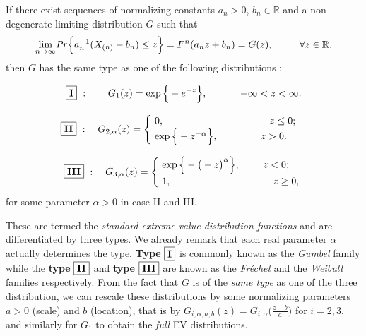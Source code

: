 \begin{theorem} \label{extthm}
 If there exist sequences of normalizing constants $a_n>0$, $b_n\in\mathbb{R}$ and a non-degenerate limiting distribution $G$ such that 
	\begin{equation} \label{exttheom}
	\displaystyle{\lim_{n \to \infty}}\text{\emph{Pr}}\Big\{ a_n^{-1}(X_{(n)}-b_n)\leq z\Big\}=F^n(a_nz+b_n)
	= G(z), \ \ \ \ \ \ \ \ \forall z\in\mathbb{R},
	\end{equation}
then $G$ has the same type as one of the following distributions : 

\begin{equation}\label{gumb}
\boxed{\textbf{\text{I}}}\ : \qquad G_{1}(z)= 
\exp\Big\{-e^{-z}\Big\}, \ \ \quad \quad \ \ -\infty<z<\infty.    
\end{equation}


\begin{equation} \label{frech}
\boxed{\textbf{\text{II}}} \  :  \quad G_{2,\alpha}(z)=
\begin{cases}
\ 0, \ \ \ \ \ \ \ \ \ \ \ \qquad \quad \ \ \ \ \ \ \ \quad \ \ z\leq 0; \\
\ \exp\Big\{-z^{-\alpha}\Big\}, \ \ \ \quad \ \quad \ \ \ z>0.    
\end{cases}
\end{equation}

\begin{equation} \label{weib}
\ \ \boxed{\textbf{\text{III}}} \ :  \quad G_{3,\alpha}(z)=\begin{cases}
\ \exp\Big\{-\big(-z\big)^{\alpha}\Big\}, \quad \quad \   z<0;     \\
\  1, \ \ \ \ \ \ \qquad \quad \quad \ \ \ \ \ \ \ \ \  \   \quad z\geq 0,
\end{cases}
\end{equation}
for some parameter $\alpha>0$ in case II and III.
\end{theorem}

These are termed the \emph{standard extreme value distribution functions} and are differentiated by three types. We already remark that each real parameter $\alpha$ actually determines the type. \textbf{Type} $\boxed{\textbf{\text{I}}}$ is commonly known as the \emph{Gumbel} family while the \textbf{type} $\boxed{\textbf{\text{II}}}$  and \textbf{type} $\boxed{\textbf{\text{III}}}$ are known as the \emph{Fréchet} and the \emph{Weibull} families respectively. From the fact that $G$ is of the \emph{same type} as one of the three distribution, we can rescale these distributions by some normalizing parameters $a>0$ (scale) and $b$ (location), that is by $G_{i,\alpha, a,b}(z)=G_{i,\alpha}\Big(\frac{z-b}{a}\Big)$ for $i=2,3$, and similarly for $G_1$ to obtain the \emph{full} EV distributions. %



